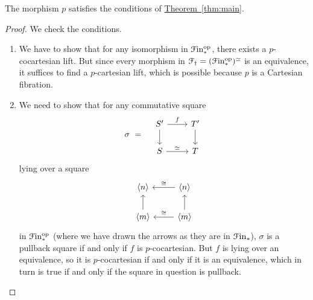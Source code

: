 \documentclass[main.tex]{subfiles}
\begin{document}
\begin{lemma}
  The morphism $p$ satisfies the conditions of \hyperref[thm:main]{Theorem~\ref*{thm:main}}.
\end{lemma}
\begin{proof}
  We check the conditions.
  \begin{enumerate}
    \item We have to show that for any isomorphism in $\mathcal{F}\mathrm{in}_{*}^{\mathrm{op}}$, there exists a $p$-cocartesian lift. But since every morphism in $\mathcal{F}_{\dagger} = (\mathcal{F}\mathrm{in}_{*}^{\mathrm{op}})^{\simeq}$ is an equivalence, it suffices to find a $p$-cartesian lift, which is possible because $p$ is a Cartesian fibration.

    \item We need to show that for any commutative square
      \begin{equation*}
        \sigma \ = \quad
        \begin{tikzcd}
          S'
          \arrow[r, "f"]
          \arrow[d]
          & T'
          \arrow[d]
          \\
          S
          \arrow[r, "\simeq"]
          & T
        \end{tikzcd}
      \end{equation*}
      lying over a square
      \begin{equation*}
        \begin{tikzcd}
          \langle n \rangle
          & \langle n \rangle
          \arrow[l, swap, "\cong"]
          \\
          \langle m \rangle
          \arrow[u]
          & \langle m \rangle
          \arrow[l, swap, "\cong"]
          \arrow[u]
        \end{tikzcd}
      \end{equation*}
      in $\mathcal{F}\mathrm{in}_{*}^{\mathrm{op}}$ (where we have drawn the arrows as they are in $\mathcal{F}\mathrm{in}_{*}$), $\sigma$ is a pullback square if and only if $f$ is $p$-cocartesian. But $f$ is lying over an equivalence, so it is $p$-cocartesian if and only if it is an equivalence, which in turn is true if and only if the square in question is pullback.
  \end{enumerate}
\end{proof}
\end{document}

